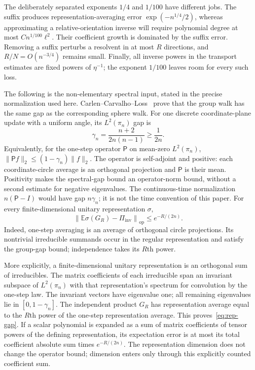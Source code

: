 \documentclass[11pt]{article}
\theoremstyle{definition}\newtheorem{definition}[theorem]{Definition}
\theoremstyle{remark}\newtheorem{remark}[theorem]{Remark}
\newcommand{\E}{\mathbb E}
\newcommand{\op}{\mathrm{op}}
\newcommand{\norm}[1]{\left\lVert#1\right\rVert}
\begin{document}
The deliberately separated exponents $1/4$ and $1/100$ have different jobs. The suffix produces representation-averaging error $\exp(-n^{1/4}/2)$, whereas approximating a relative-orientation inverse will require polynomial degree at most $Cn^{1/100}\ell^2$. Their coefficient growth is dominated by the suffix error. Removing a suffix perturbs a resolvent in at most $R$ directions, and $R/N=O(n^{-3/4})$ remains small. Finally, all inverse powers in the transport estimates are fixed powers of $\eta^{-1}$; the exponent $1/100$ leaves room for every such loss.


The following is the non-elementary spectral input, stated in the precise normalization used here. Carlen--Carvalho--Loss~\cite[Section 6]{CCL} prove that the group walk has the same gap as the corresponding sphere walk. For one discrete coordinate-plane update with a uniform angle, its $L^2(\pi_n)$ gap is
\begin{equation}\label{eq:classical-gap}
 \gamma_n=\frac{n+2}{2n(n-1)}\ge\frac1{2n}.
\end{equation}
Equivalently, for the one-step operator $\mathsf P$ on mean-zero $L^2(\pi_n)$,
$\|\mathsf P f\|_2\le(1-\gamma_n)\|f\|_2$. The operator is self-adjoint and positive: each coordinate-circle average is an orthogonal projection and $\mathsf P$ is their mean. Positivity makes the spectral-gap bound an operator-norm bound, without a second estimate for negative eigenvalues. The continuous-time normalization $n(\mathsf P-I)$ would have gap $n\gamma_n$; it is not the time convention of this paper. For every finite-dimensional unitary representation $\sigma$,
\begin{equation}\label{eq:rep-gap}
 \norm{\E\sigma(G_R)-\Pi_{\mathrm{inv}}}_{\op}
 \le e^{-R/(2n)}.
\end{equation}
Indeed, one-step averaging is an average of orthogonal circle projections. Its nontrivial irreducible summands occur in the regular representation and satisfy the group-gap bound; independence takes its $R$th power.

More explicitly, a finite-dimensional unitary representation is an orthogonal sum of irreducibles. The matrix coefficients of each irreducible span an invariant subspace of $L^2(\pi_n)$ with that representation's spectrum for convolution by the one-step law. The invariant vectors have eigenvalue one; all remaining eigenvalues lie in $[0,1-\gamma_n]$. The independent product $G_R$ has representation average equal to the $R$th power of the one-step representation average. This proves~\eqref{eq:rep-gap}. If a scalar polynomial is expanded as a sum of matrix coefficients of tensor powers of the defining representation, its expectation error is at most its total coefficient absolute sum times $e^{-R/(2n)}$. The representation dimension does not change the operator bound; dimension enters only through this explicitly counted coefficient sum.
\end{document}
